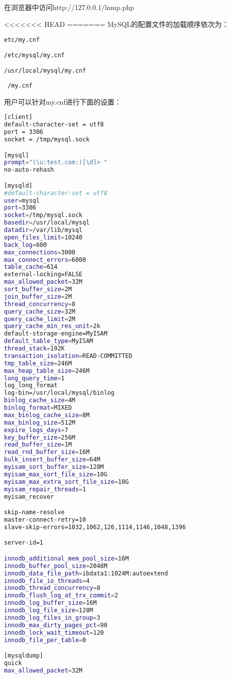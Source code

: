 在浏览器中访问http://127.0.0.1/lnmp.php



<<<<<<< HEAD
=======
MySQL的配置文件的加载顺序依次为：

\begin{compactitem}
\item \texttt{etc/my.cnf}
\item \texttt{/etc/mysql/my.cnf}
\item \texttt{/usr/local/mysql/my.cnf}
\item \texttt{~/my.cnf}
\end{compactitem}

用户可以针对my.cnf进行下面的设置：


\begin{lstlisting}[language=bash]
[client]
default-character-set = utf8
port = 3306
socket = /tmp/mysql.sock

[mysql]
prompt="(\u:test.com:)[\d]> "
no-auto-rehash

[mysqld]
#default-character-set = utf8
user=mysql
port=3306
socket=/tmp/mysql.sock
basedir=/usr/local/mysql
datadir=/var/lib/mysql
open_files_limit=10240
back_log=600
max_connections=3000
max_connect_errors=6000
table_cache=614
external-locking=FALSE
max_allowed_packet=32M
sort_buffer_size=2M
join_buffer_size=2M
thread_concurrency=8
query_cache_size=32M
query_cache_limit=2M
query_cache_min_res_unit=2k
default-storage-engine=MyISAM
default_table_type=MyISAM
thread_stack=192K
transaction_isolation=READ-COMMITTED
tmp_table_size=246M
max_heap_table_size=246M
long_query_time=1
log_long_format
log-bin=/usr/local/mysql/binlog
binlog_cache_size=4M
binlog_format=MIXED
max_binlog_cache_size=8M
max_binlog_size=512M
expire_logs_days=7
key_buffer_size=256M
read_buffer_size=1M
read_rnd_buffer_size=16M
bulk_insert_buffer_size=64M
myisam_sort_buffer_size=128M
myisam_max_sort_file_size=10G
myisam_max_extra_sort_file_size=10G
myisam_repair_threads=1
myisam_recover

skip-name-resolve
master-connect-retry=10
slave-skip-errors=1032,1062,126,1114,1146,1048,1396

server-id=1

innodb_additional_mem_pool_size=16M
innodb_buffer_pool_size=2048M
innodb_data_file_path=ibdata1:1024M:autoextend
innodb_file_io_threads=4
innodb_thread_concurrency=8
innodb_flush_log_at_trx_commit=2
innodb_log_buffer_size=16M
innodb_log_file_size=128M
innodb_log_files_in_group=3
innodb_max_dirty_pages_pct=90
innodb_lock_wait_timeout=120
innodb_file_per_table=0

[mysqldump]
quick
max_allowed_packet=32M
\end{lstlisting}





